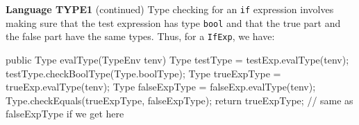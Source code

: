 \begin{minipage}[t]{\sw}
\slidenumber
\LARGE
{\bf Language TYPE1} (continued)\exx
Type checking for an \verb'if' expression involves
making sure that the test expression has type \verb'bool'
and that the true part and the false part have the same types.
Thus, for a \verb'IfExp', we have:
\Large
\begin{qv}
public Type evalType(TypeEnv tenv) {
    Type testType = testExp.evalType(tenv);
    testType.checkBoolType(Type.boolType);
    Type trueExpType = trueExp.evalType(tenv);
    Type falseExpType = falseExp.evalType(tenv);
    Type.checkEquals(trueExpType, falseExpType);
    return trueExpType; // same as falseExpType if we get here
}
\end{qv}

\end{minipage}
